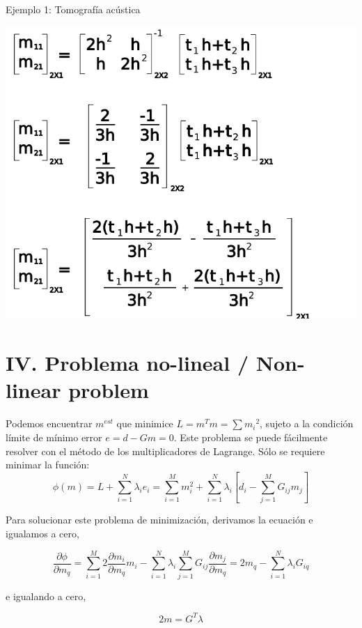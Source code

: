 \documentclass[aspectratio=169]{beamer}
\begin{document}
\begin{frame}
 {Ejemplo 1: Tomografía acústica}
 
 \begin{center}
 \includegraphics[width=0.6\linewidth]{images/tomografia_9.png}
 \end{center}

\end{frame}



\section{\small IV. Problema no-lineal / Non-linear problem}

\begin{frame}
 
{\color{black}Podemos encuentrar $m^{est}$ que minimice $L=m^Tm=\sum{m_i}^2$, sujeto a la condición límite de mínimo error $e = d - Gm = 0$. Este problema se puede fácilmente resolver con el método de los multiplicadores de Lagrange. Sólo se requiere minimar la función:
 \begin{equation}
  \phi(m) = L + \sum_{i=1}^N{\lambda_i e_i} = \sum_{i=1}^M m^2_i + \sum_{i=1}^N{ \lambda_i   \left[ d_i - \sum^M_{j=1} G_{ij}m_j\right]
}
\end{equation}


Para solucionar este problema de minimización, derivamos la ecuación e igualamos a cero,

\begin{equation}
 \frac{\partial\phi}{\partial m_q} = 
 \sum_{i=1}^M 2 \frac{\partial m_i}{\partial m_q} m_i - \sum_{i=1}^N \lambda_i 
 \sum_{j=1}^M {G_{ij} \frac{\partial m_j}{\partial m_q}} = 2m_q - \sum_{i=1}^N{\lambda_i G_{iq}}
\end{equation}

e igualando a cero,

\begin{equation}
 2m =  G^T \lambda
\end{equation}
}
 
\end{frame}
\end{document}
